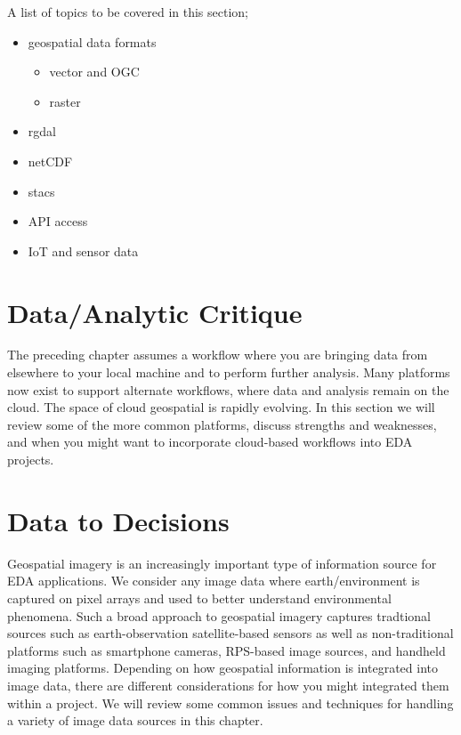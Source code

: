 \documentclass[
]{book}
\providecommand{\tightlist}{%
  \setlength{\itemsep}{0pt}\setlength{\parskip}{0pt}}
\begin{document}
A list of topics to be covered in this section;

\begin{itemize}
\tightlist
\item
  geospatial data formats

  \begin{itemize}
  \tightlist
  \item
    vector and OGC
  \item
    raster
  \end{itemize}
\item
  rgdal
\item
  netCDF
\item
  stacs
\item
  API access
\item
  IoT and sensor data
\end{itemize}

\hypertarget{dataanalytic-critique}{%
\chapter{Data/Analytic Critique}\label{dataanalytic-critique}}

The preceding chapter assumes a workflow where you are bringing data from elsewhere to your local machine and to perform further analysis. Many platforms now exist to support alternate workflows, where data and analysis remain on the cloud. The space of cloud geospatial is rapidly evolving. In this section we will review some of the more common platforms, discuss strengths and weaknesses, and when you might want to incorporate cloud-based workflows into EDA projects.

\hypertarget{data-to-decisions}{%
\chapter{Data to Decisions}\label{data-to-decisions}}

Geospatial imagery is an increasingly important type of information source for EDA applications. We consider any image data where earth/environment is captured on pixel arrays and used to better understand environmental phenomena. Such a broad approach to geospatial imagery captures tradtional sources such as earth-observation satellite-based sensors as well as non-traditional platforms such as smartphone cameras, RPS-based image sources, and handheld imaging platforms. Depending on how geospatial information is integrated into image data, there are different considerations for how you might integrated them within a project. We will review some common issues and techniques for handling a variety of image data sources in this chapter.

  
\end{document}
